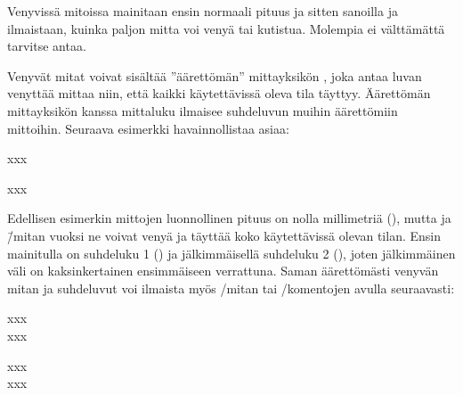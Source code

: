\begin{koodilohkosis}
  \setlength{\parskip}{2ex plus 0.2ex minus 0.1ex}
  \setlength{\parindent}{0em}
\end{koodilohkosis}

Venyvissä mitoissa mainitaan ensin normaali pituus ja sitten sanoilla
 ja  ilmaistaan, kuinka paljon mitta voi venyä
tai kutistua. Molempia ei välttämättä tarvitse antaa.

Venyvät mitat voivat sisältää ''äärettömän'' mittayksikön ,
joka antaa luvan venyttää mittaa niin, että kaikki käytettävissä oleva
tila täyttyy. Äärettömän mittayksikön kanssa mittaluku ilmaisee
suhdeluvun muihin äärettömiin mittoihin. Seuraava esimerkki
havainnollistaa asiaa:


\begin{koodilohkosis}
  x\hspace{0mm plus 1fill}x\hspace{0mm plus 2fill}x
\end{koodilohkosis}

\begin{tulossis}
  x\hspace{0mm plus 1fill}x\hspace{0mm plus 2fill}x
\end{tulossis}

Edellisen esimerkin mittojen luonnollinen pituus on nolla millimetriä
(\koodi{0mm}), mutta  ja  \=/mitan vuoksi ne
voivat venyä ja täyttää koko käytettävissä olevan tilan. Ensin
mainitulla on suhdeluku 1 () ja jälkimmäisellä suhdeluku 2
(), joten jälkimmäinen väli on kaksinkertainen ensimmäiseen
verrattuna. Saman äärettömästi venyvän mitan ja suhdeluvut voi ilmaista
myös \-/mitan tai \-/komentojen
avulla seuraavasti:


\begin{koodilohkosis}
  xxx \\
  x\hfill x\hfill\hfill x
\end{koodilohkosis}

\begin{tulossis}
  xxx \\
  x\hfill x\hfill\hfill x
\end{tulossis}

